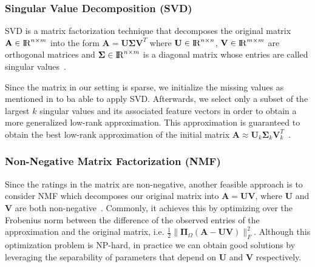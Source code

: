 \documentclass[10pt,conference,compsocconf]{IEEEtran}
\begin{document}
    \subsubsection{Singular Value Decomposition (SVD)}

    SVD is a matrix factorization technique that decomposes the original matrix $\mathbf{A} \in {\rm I\!R}^{n \times m} $ into the form $ \mathbf{A} = \mathbf{U \Sigma V}^T $ where $\mathbf{U} \in {\rm I\!R}^{n \times n}$,  $\mathbf{V}  \in {\rm I\!R}^{m \times m}$ are orthogonal matrices and $\mathbf{\Sigma} \in {\rm I\!R}^{n \times m}$ is a diagonal matrix whose entries are called singular values~\cite{svd}.

    Since the matrix in our setting is sparse, we initialize the missing values as mentioned in  to ba able to apply SVD.
    Afterwards, we select only a subset of the largest $k$ singular values and its associated feature vectors in order to obtain a more generalized low-rank approximation.
    This approximation is guaranteed to obtain the best low-rank approximation of the initial matrix $\mathbf{A}\approx \mathbf{U}_k \mathbf{\Sigma}_k \mathbf{V}^T_k$~\cite{Eckart1936}.

    \subsubsection{Non-Negative Matrix Factorization (NMF)}

    Since the ratings in the matrix are non-negative, another feasible approach is to consider NMF which decomposes our original matrix into $\mathbf{A} = \mathbf{UV}$, where $\mathbf{U}$ and $\mathbf{V}$ are both non-negative~\cite{gillis2014nonnegative}.
    Commonly, it achieves this by optimizing over the Frobenius norm between the difference of the observed entries of the approximation and the original matrix, i.e. $ \frac{1}{2}\|\mathbf{\Pi}_{\Omega}(\mathbf{A} - \mathbf{UV})\|^2_F$.
    Although this optimization problem is NP-hard, in practice we can obtain good solutions by leveraging the separability of parameters that depend on $\mathbf{U}$ and $\mathbf{V}$ respectively.
\end{document}
